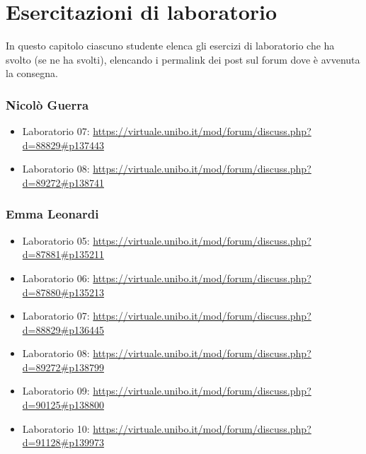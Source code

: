 \documentclass[a4paper,12pt]{report}
\begin{document}
\chapter{Esercitazioni di laboratorio}

In questo capitolo ciascuno studente elenca gli esercizi di laboratorio che ha svolto
(se ne ha svolti),
elencando i permalink dei post sul forum dove è avvenuta la consegna.

\subsection{Nicolò Guerra}
\begin{itemize}
	\item Laboratorio 07: \url{https://virtuale.unibo.it/mod/forum/discuss.php?d=88829#p137443}
	\item Laboratorio 08: \url{https://virtuale.unibo.it/mod/forum/discuss.php?d=89272#p138741}
\end{itemize}

\subsection{Emma Leonardi}
\begin{itemize}
	\item Laboratorio 05: \url{https://virtuale.unibo.it/mod/forum/discuss.php?d=87881#p135211}
	\item Laboratorio 06: \url{https://virtuale.unibo.it/mod/forum/discuss.php?d=87880#p135213}
	\item Laboratorio 07: \url{https://virtuale.unibo.it/mod/forum/discuss.php?d=88829#p136445}
	\item Laboratorio 08: \url{https://virtuale.unibo.it/mod/forum/discuss.php?d=89272#p138799}
	\item Laboratorio 09: \url{https://virtuale.unibo.it/mod/forum/discuss.php?d=90125#p138800}
	\item Laboratorio 10: \url{https://virtuale.unibo.it/mod/forum/discuss.php?d=91128#p139973}
\end{itemize}



\end{document}
